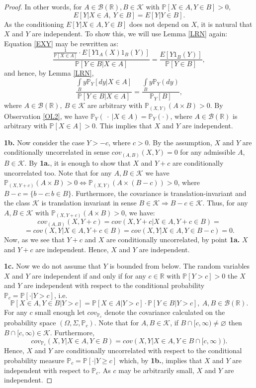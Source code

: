 \documentclass[sn-mathphys,Numbered,11pt]{sn-jnl}%
\theoremstyle{thmstyleone}%
\newcommand{\R}{\mathbb{R}}
\newcommand{\PP}{\mathbb{P}}
\newcommand{\B}{\mathcal{B}(\R)}
\newcommand{\KK}{\mathcal{K}}
\begin{document}
\begin{proof}
In other words, for $A\in\B, B\in\KK$  with $\PP[X\in A, Y\in B]>0$,
\begin{equation}\label{EXY}
E[Y|X\in A,\ Y\in B]=E[Y| Y \in B].
\end{equation}
 As the conditioning $E[Y|X\in A, Y\in B]$ does not depend on $X$, it is  natural  that $X$ and $Y$ are independent. To show this, we will use Lemma \ref{LRN} again: Equation \eqref{EXY} may be rewritten as:
$$\frac{\frac{1}{\PP[X\in A]}\cdot E[Y1_A(X)1_B(Y)]}{\PP[Y\in B| X \in A]}=\frac{E[Y1_B(Y)]}{\PP[Y\in B]},$$
 and hence, by Lemma \ref{LRN}, 
$$\frac{\int\limits_B y\PP_Y[ dy| X \in A]}{\PP[Y\in B| X \in A]}=\frac{\int\limits_By\PP_Y(dy)}{\PP_Y[ B]},$$
where $A\in\B,\ B\in\KK$  are arbitrary with $\PP_{(X,Y)}(A\times B)>0$.
 By Observation \ref{OL2}, we have $\PP_Y(\ \cdot\ |X\in A)=\PP_Y(\cdot)$, where  $A\in\B$ is arbitrary with $\PP[X\in A]>0$. This implies that $X$ and $Y$ are independent. 

\textbf{1b.} Now consider the case $Y>-c$, where $c>0$. By the assumption, $X$ and $Y$ are conditionally uncorrelated in sense $cov_{(A,B)}(X,Y)=0$ for any admissible $A$,$B\in \KK$. By \textbf{1a.}, it is enough to show that $X$ and $Y+c$ are conditionally uncorrelated too. Note that for any $A,B\in \KK$  we have $\PP_{(X,Y+c)}(
A\times B)>0\Leftrightarrow \PP_{(X,Y)}(A\times(B-c))>0$, where $B-c=\{b-c\colon b\in B\}$. Furthermore, the covariance is translation-invariant and the class $\KK$ is translation invariant in sense $B\in\KK \Rightarrow B-c\in\KK.$ Thus, for any $A,B\in\KK$ with $\PP_{(X,Y+c)}(A\times B)>0$, we have:
$$cov_{(A,B)}(X,Y+c)=cov(X,Y+c|X\in A, Y+c\in B)=$$
$$=cov(X,Y|X\in A, Y+c\in B)=cov(X,Y|X\in A, Y\in B-c)=0.$$
 Now, as we see that $Y+c$ and $X$ are conditionally uncorrelated, by point \textbf{1a.} $X$ and $Y+c$ are independent. Hence, $X$ and $Y$ are independent.

\textbf{1c.} Now we do not assume that $Y$ is bounded from below. The random variables $X$ and $Y$ are independent if and only if for any $c\in\R$ with $\PP[Y>c]>0$ 
the $X$ and $Y$ are independent with respect to the conditional probability $\PP_c=\PP[\cdot| Y>c]$, i.e. 
$$\PP[X\in A, Y\in B|Y>c]=\PP[X\in A| Y>c]\cdot \PP[Y\in B| Y>c], \ A,B\in\B.$$
For any $c$ small enough let $cov_{\PP_c}$ denote the covariance calculated on the probability space $(\Omega,\Sigma,\PP_c)$. Note that for $A,B\in \KK$, if $B\cap [c,\infty)\neq \varnothing$ then $B\cap [c,\infty)\in\KK$. Furthermore,
$$cov_{\PP_c}(X,Y|X\in A, Y\in B)= cov(X,Y|X\in A,Y\in B \cap [c,\infty)).$$
Hence, $X$ and $Y$ are conditionally uncorrelated with respect to the conditional probability measure $\PP_c=\PP[\cdot|Y\geq c]$ which, by \textbf{1b.}, implies that $X$ and $Y$ are independent with respect to $\PP_c$. As $c$ may be arbitrarily small, $X$ and $Y$ are independent. 


\end{proof}
\end{document}
